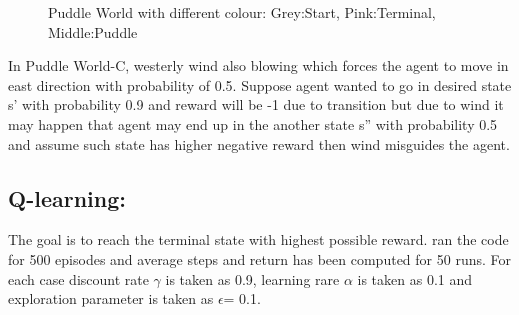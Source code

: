 \documentclass[preprint,12pt]{elsarticle}
\begin{document}
\begin{figure}[H]
	\centering  
	\caption{Puddle World with different colour: Grey:Start, Pink:Terminal, Middle:Puddle }
	\label{fig:puddle}
\end{figure}

In Puddle World-C, westerly wind also blowing which forces the agent to move in east direction with probability of 0.5. Suppose agent wanted to go in desired state s' with probability 0.9 and reward will be -1 due to transition but due to wind it may happen that agent may end up in the another state s'' with probability 0.5 and assume such state has higher negative reward then wind misguides the agent.

\subsection{Q-learning:}
The goal is to reach the terminal state with highest possible reward. ran the code for 500 episodes and average steps and return has been computed for 50 runs. 
For each case discount rate $\gamma$ is taken as 0.9, learning rare $\alpha$ is taken as 0.1 and exploration parameter is taken as $\epsilon$= 0.1. 
\end{document}
